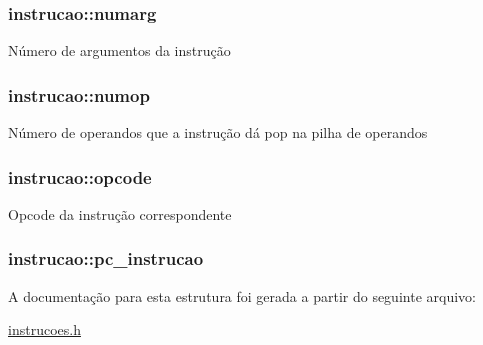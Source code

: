 \subsubsection[{\texorpdfstring{numarg}{numarg}}]{\setlength{\rightskip}{0pt plus 5cm}instrucao\+::numarg}\hypertarget{structinstrucao_abe29e9abb3acf6ab4f1b4690d31b456d}{}\label{structinstrucao_abe29e9abb3acf6ab4f1b4690d31b456d}
Número de argumentos da instrução 
\subsubsection[{\texorpdfstring{numop}{numop}}]{\setlength{\rightskip}{0pt plus 5cm}instrucao\+::numop}\hypertarget{structinstrucao_ada3363067b90142344358001d51dd197}{}\label{structinstrucao_ada3363067b90142344358001d51dd197}
Número de operandos que a instrução dá pop na pilha de operandos 
\subsubsection[{\texorpdfstring{opcode}{opcode}}]{\setlength{\rightskip}{0pt plus 5cm}instrucao\+::opcode}\hypertarget{structinstrucao_a588fa0d2c21e3de3d31382cdd08a3f6c}{}\label{structinstrucao_a588fa0d2c21e3de3d31382cdd08a3f6c}
Opcode da instrução correspondente 
\subsubsection[{\texorpdfstring{pc\+\_\+instrucao}{pc_instrucao}}]{ instrucao\+::pc\+\_\+instrucao}\hypertarget{structinstrucao_adf700f8998ffadaabba2ebf5aa4f6e21}{}\label{structinstrucao_adf700f8998ffadaabba2ebf5aa4f6e21}


A documentação para esta estrutura foi gerada a partir do seguinte arquivo\+:\begin{DoxyCompactItemize}
\item 
\hyperlink{instrucoes_8h}{instrucoes.\+h}\end{DoxyCompactItemize}
